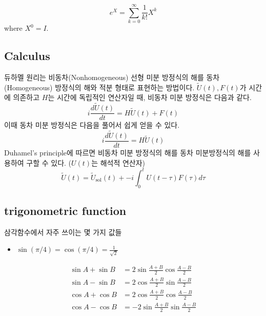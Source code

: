 \documentclass[
]{kaohandt}
\begin{document}
\begin{theorem}
    $$e^X=\sum_{k=0}^{\infty} \frac{1}{k!} X^k$$
    where $X^0 = I$.
\end{theorem}

\subsection{Calculus}
\begin{theorem}
    듀하멜 원리는 비동차(Nonhomogeneous) 선형 미분 방정식의 해를 동차(Homogeneous) 방정식의 해와 적분 형태로 표현하는 방법이다.
    $\tilde U(t), F(t)$가 시간에 의존하고 $H$는 시간에 독립적인 연산자일 때, 비동차 미분 방정식은 다음과 같다.
    $$i \frac{d \tilde U(t)}{d t}=H \tilde U(t)+F(t)$$
    이때 동차 미분 방정식은 다음을 풀어서 쉽게 얻을 수 있다.
    $$i \frac{d \tilde U(t)}{d t}=H \tilde U(t)$$
    Duhamel's principle에 따르면 비동차 미분 방정식의 해를 동차 미분방정식의 해를 사용하여 구할 수 있다. ($U(t)$는 해석적 연산자)
    $$\tilde U(t) = \tilde U_{\mathrm{sol}}(t)+ -i \int_0^t U(t-\tau) F(\tau) d \tau$$ 
\end{theorem}

\subsection{trigonometric function}
\begin{remark}
    삼각함수에서 자주 쓰이는 몇 가지 값들
    \begin{itemize}
        \item $\sin(\pi/4) = \cos(\pi/4) = \frac{1}{\sqrt 2}$
    \end{itemize}
\end{remark}

\begin{remark}[삼각함수 합 공식]
    \begin{align*}  \sin A + \sin B &= 2\sin\frac{A+B}{2}  \cos \frac{A-B}{2}\\  \sin A - \sin B &= 2\cos\frac{A+B}{2}  \sin \frac{A-B}{2}\\  \cos A + \cos B &= 2\cos\frac{A+B}{2}  \cos \frac{A-B}{2}\\ \cos A - \cos B &= - 2\sin\frac{A+B}{2}  \sin \frac{A-B}{2}\end{align*}
\end{remark}
\end{document}
